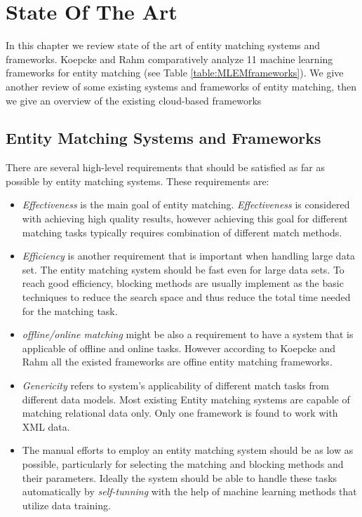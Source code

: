 \chapter{State Of The Art}

In this chapter we review state of the art of entity matching systems and frameworks. Koepcke and Rahm \cite{KoRa10} comparatively analyze 11 machine learning frameworks for entity matching (see Table \ref{table:MLEMframeworks}). We give another review of some existing systems and frameworks of entity matching\cite{Chri12}, then we give an overview of the existing cloud-based frameworks

\section {Entity Matching Systems and Frameworks}
There are several high-level requirements that should be satisfied as far as possible by entity matching systems. These requirements are:

\begin{itemize}
\item \textit{Effectiveness} is the main goal of entity matching. \textit{Effectiveness} is considered with achieving high quality results, however achieving this goal for different matching tasks typically requires combination of different match methods. 

\item \textit{Efficiency} is another requirement that is important when handling large data set. The entity matching system should be fast even for large data sets. To reach good efficiency, blocking methods are usually implement as the basic techniques to reduce the search space and thus reduce the total time needed for the matching task. 

\item \textit{offline/online matching} might be also a requirement to have a system that is applicable of offline and online tasks. However according to Koepcke and Rahm \cite{KoRa10} all the existed frameworks are offine entity matching frameworks. 

\item \textit{Genericity} refers to system's applicability of different match tasks from different data models. Most existing Entity matching systems are capable of matching relational data only. Only one framework is found to work with XML data. 

\item  The manual efforts to employ an entity matching system should be as low as possible, particularly for selecting the matching and blocking methods and their parameters. Ideally the system should be able to handle these tasks automatically by \textit{self-tunning} with the help of machine learning methods that utilize data training. 
\end{itemize}

